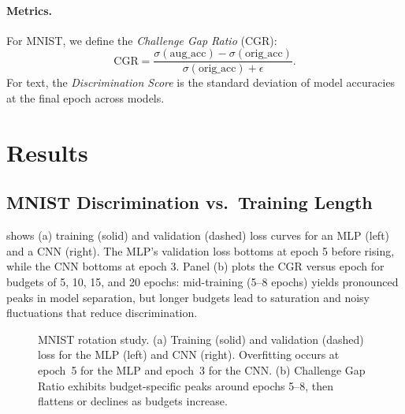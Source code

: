 \documentclass{article} %
\begin{document}
\paragraph{Metrics.}
For MNIST, we define the \emph{Challenge Gap Ratio} (CGR):
\[
  \mathrm{CGR} = \frac{\sigma(\mathrm{aug\_acc}) - \sigma(\mathrm{orig\_acc})}
                   {\sigma(\mathrm{orig\_acc})+\epsilon}.
\]
For text, the \emph{Discrimination Score} is the standard deviation of model accuracies at the final epoch across models.

\section{Results}
\subsection{MNIST Discrimination vs.\ Training Length}
 shows (a) training (solid) and validation (dashed) loss curves for an MLP (left) and a CNN (right). The MLP's validation loss bottoms at epoch 5 before rising, while the CNN bottoms at epoch 3. Panel (b) plots the CGR versus epoch for budgets of 5, 10, 15, and 20 epochs: mid-training (5–8 epochs) yields pronounced peaks in model separation, but longer budgets lead to saturation and noisy fluctuations that reduce discrimination.

\begin{figure}[t]
  \centering
  \quad
  \caption{MNIST rotation study. (a) Training (solid) and validation (dashed) loss for the MLP (left) and CNN (right). Overfitting occurs at epoch~5 for the MLP and epoch~3 for the CNN. (b) Challenge Gap Ratio exhibits budget-specific peaks around epochs 5–8, then flattens or declines as budgets increase.}
  \label{fig:mnist_loss_cgr}
\end{figure}
\end{document}
